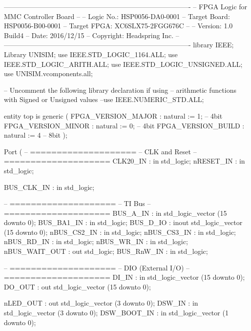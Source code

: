 
\begin{mylisting}[language=VHDL,caption=トップモジュール,label=appF_Top_module_VHDL]

----------------------------------------------------------------------------------
-- FPGA Logic for MMC Controller Board
--
--		Logic No.:		HSP0056-DA0-0001
--		Target Board:	HSP0056-B00-0001
--		Target FPGA:	XC6SLX75-2FGG676C
--
--		Version:		1.0 Build4
--		Date:			2016/12/15
--		Copyright:		Headspring Inc.
--
----------------------------------------------------------------------------------
library IEEE;
Library UNISIM;
use IEEE.STD_LOGIC_1164.ALL;
use IEEE.STD_LOGIC_ARITH.ALL;
use IEEE.STD_LOGIC_UNSIGNED.ALL;
use UNISIM.vcomponents.all;

-- Uncomment the following library declaration if using
-- arithmetic functions with Signed or Unsigned values
--use IEEE.NUMERIC_STD.ALL;


entity top is
	generic (
		FPGA_VERSION_MAJOR		: natural := 1;			-- 4bit
		FPGA_VERSION_MINOR		: natural := 0;			-- 4bit
		FPGA_VERSION_BUILD		: natural := 4			-- 8bit
	);

	Port ( 
		-- ====================
		-- CLK and Reset
		-- ====================
		CLK20_IN			: in std_logic;
		nRESET_IN			: in std_logic;

		BUS_CLK_IN			: in std_logic;

		-- ====================
		-- TI Bus
		-- ====================
		BUS_A_IN				: in  std_logic_vector (15 downto 0);
		BUS_BA1_IN				: in  std_logic;
		BUS_D_IO				: inout  std_logic_vector (15 downto 0);
		nBUS_CS2_IN				: in  std_logic;
		nBUS_CS3_IN				: in  std_logic;
		nBUS_RD_IN				: in  std_logic;
		nBUS_WR_IN				: in  std_logic;
		nBUS_WAIT_OUT			: out std_logic;
		BUS_RnW_IN				: in  std_logic;


		-- ====================
		-- DIO	(External I/O)
		-- ====================
		DI_IN					: in  std_logic_vector (15 downto 0);
		DO_OUT					: out std_logic_vector (15 downto 0);

		nLED_OUT				: out std_logic_vector (3 downto 0);
		DSW_IN					: in  std_logic_vector (3 downto 0);
		DSW_BOOT_IN				: in  std_logic_vector (1 downto 0);


\end{mylisting}
